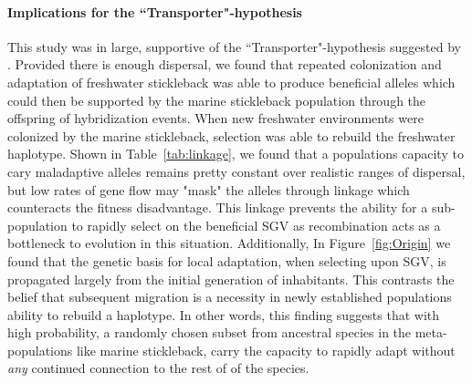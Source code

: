 \documentclass{article}
\begin{document}
\paragraph{Implications for the ``Transporter"-hypothesis}
This study was in large, supportive of the ``Transporter"-hypothesis suggested by \citep{schluter2009genetics}.
Provided there is enough dispersal, we found that repeated colonization and adaptation of freshwater stickleback was able to produce beneficial alleles which could then be 
supported by the marine stickleback population through the offspring of hybridization events. 
When new freshwater environments were colonized by the marine stickleback, selection was able to rebuild the freshwater haplotype. 
Shown in Table~\ref{tab:linkage}, we found that a populations capacity to cary maladaptive alleles remains pretty constant over realistic ranges of dispersal, but low rates of gene flow may 
"mask" the alleles through linkage which counteracts the fitness disadvantage. 
This linkage prevents the ability for a sub-population to rapidly select on the beneficial SGV as recombination acts as a bottleneck to evolution in this situation. 
Additionally, In Figure~\ref{fig:Origin} we found that the genetic basis for local adaptation, when selecting upon SGV, is propagated largely from the initial generation of inhabitants. 
This contrasts the belief that subsequent migration is a necessity in newly established populations ability to rebuild a haplotype.
In other words, this finding suggests that with high probability, a randomly chosen subset from ancestral species in the meta-populations like marine stickleback, 
carry the capacity to rapidly adapt without \emph{any} continued connection to the rest of of the species.
\end{document}
